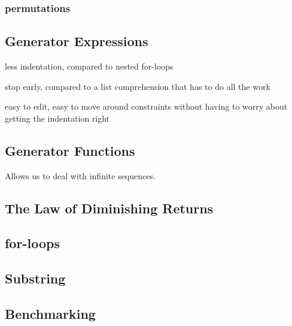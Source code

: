 \documentclass[12pt]{article}
\begin{document}
\subsubsection{permutations}


\subsection{Generator Expressions}

\begin{list}{*}{
\setlength{\itemsep}{0pt}
\setlength{\parsep}{0pt}
\setlength{\topsep}{0pt}
\setlength{\partopsep}{0pt}
\setlength{\leftmargin}{2em}
\setlength{\labelwidth}{1.5em}
\setlength{\labelsep}{0.5em}
}
\item less indentation, compared to nested for-loops
\item stop early, compared to a list comprehension that has to do all the work
\item easy to edit, easy to move around constraints without having to worry about getting the indentation right
\end{list}



\subsection{Generator Functions}

Allows us to deal with infinite sequences.



\subsection{The Law of Diminishing Returns}

\subsection{for-loops}


\subsection{Substring}


\subsection{Benchmarking}

\end{document}

